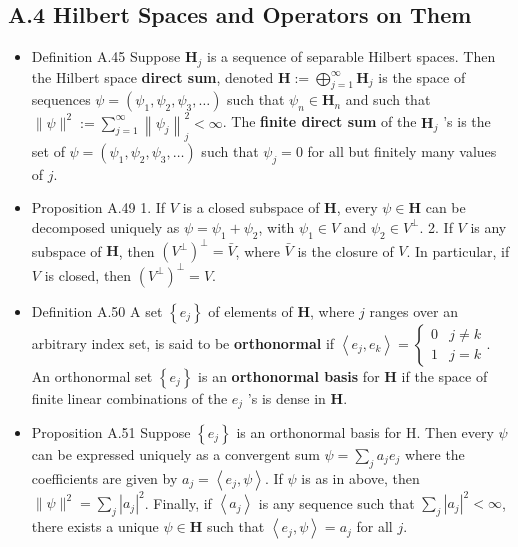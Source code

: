 \subsection{A.4 Hilbert Spaces and Operators on Them}

\begin{itemize}
\item Definition A.45 Suppose $\mathbf{H}_{j}$ is a sequence of separable Hilbert spaces. Then the Hilbert space \textbf{direct sum}, denoted $\mathbf{H}:=\bigoplus_{j=1}^{\infty} \mathbf{H}_{j}$ is the space of sequences $\psi=\left(\psi_{1}, \psi_{2}, \psi_{3}, \ldots\right)$ such that $\psi_{n} \in \mathbf{H}_{n}$ and such that $\|\psi\|^{2}:=\sum_{j=1}^{\infty}\left\|\psi_{j}\right\|_{j}^{2}<\infty$. The \textbf{finite direct sum} of the $\mathbf{H}_{j}$ 's is the set of $\psi=\left(\psi_{1}, \psi_{2}, \psi_{3}, \ldots\right)$ such that $\psi_{j}=0$ for all but finitely many values of $j$.

\item Proposition A.49 1. If $V$ is a closed subspace of $\mathbf{H}$, every $\psi \in \mathbf{H}$ can be decomposed uniquely as $\psi=\psi_{1}+\psi_{2}$, with $\psi_{1} \in V$ and $\psi_{2} \in V^{\perp}$. 2. If $V$ is any subspace of $\mathbf{H}$, then $\left(V^{\perp}\right)^{\perp}=\bar{V}$, where $\bar{V}$ is the closure of $V$. In particular, if $V$ is closed, then $\left(V^{\perp}\right)^{\perp}=V$.

\item Definition A.50 A set $\left\{e_{j}\right\}$ of elements of $\mathbf{H}$, where $j$ ranges over an arbitrary index set, is said to be \textbf{orthonormal} if $\left\langle e_{j}, e_{k}\right\rangle=\left\{\begin{array}{cc}
0 & j \neq k \\
1 & j=k
\end{array} .\right.$ An orthonormal set $\left\{e_{j}\right\}$ is an \textbf{orthonormal basis} for $\mathbf{H}$ if the space of finite linear combinations of the $e_{j}$ 's is dense in $\mathbf{H}$.

\item Proposition A.51 Suppose $\left\{e_{j}\right\}$ is an orthonormal basis for H. Then every $\psi$ can be expressed uniquely as a convergent sum $\psi=\sum_{j} a_{j} e_{j}$ where the coefficients are given by $a_{j}=\left\langle e_{j}, \psi\right\rangle$. If $\psi$ is as in above, then $\|\psi\|^{2}=\sum_{j}\left|a_{j}\right|^{2}$. Finally, if $\left\langle a_{j}\right\rangle$ is any sequence such that $\sum_{j}\left|a_{j}\right|^{2}<\infty$, there exists a unique $\psi \in \mathbf{H}$ such that $\left\langle e_{j}, \psi\right\rangle=a_{j}$ for all $j$.
\end{itemize}


